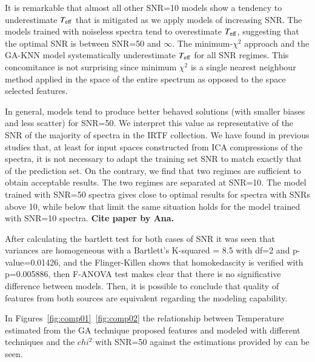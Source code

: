 It is remarkable that almost all other SNR=10 models show a tendency
to underestimate $T_{\rm eff}$ that is mitigated as we apply models of
increasing SNR. The models trained with noiseless spectra tend to
overestimate $T_{\rm eff}$, suggesting that the optimal SNR is between
SNR=50 and $\infty$. The minimum-$\chi^2$ approach and the GA-KNN
model systematically underestimate $T_{\rm eff}$ for all SNR
regimes. This concomitance is not surprising since minimum $\chi^2$ is
a single nearest neighbour method applied in the space of the entire
spectrum as opposed to the space selected features.

In general, models tend to produce better behaved solutions (with
smaller biases and less scatter) for SNR=50. We interpret this value
as representative of the SNR of the majority of spectra in the IRTF
collection. We have found in previous studies that, at least for input
spaces constructed from ICA compressions of the spectra, it is not
necessary to adapt the training set SNR to match exactly that of the
prediction set. On the contrary, we find that two regimes are
sufficient to obtain acceptable results. The two regimes are separated
at SNR=10. The model trained with SNR=50 spectra gives close to
optimal results for spectra with SNRs above 10, while below that limit
the same situation holds for the model trained with SNR=10
spectra. {\bf Cite paper by Ana.}

After calculating the bartlett test for both cases of SNR it was seen
that variances are homogeneous with a Bartlett\textquoteright s
K-squared = 8.5 with df=2 and p-value=0.01426, and the Flinger-Killen
shows that homokedascity is verified with p=0.005886, then F-ANOVA
test makes clear that there is no significative difference between
models. Then, it is possible to conclude that quality of features from
both sources are equivalent regarding the modeling capability.



In Figures~\ref{fig:comp01}~\ref{fig:comp02} the relationship between Temperature
estimated from the GA technique proposed features and modeled with different 
techniques and the $chi^2$ with SNR=50 against the 
estimations provided by \cite{cesetti} can be seen.

